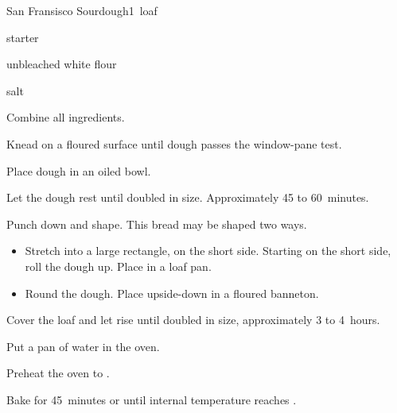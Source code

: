 \begin{recipe}{San Fransisco Sourdough}{}{1~loaf}

\begin{ingredients}
\item \C{1\threequarter} starter
\item {} unbleached white flour
\item {} salt
\end{ingredients}

\begin{directions}
\item Combine all ingredients.
\item Knead on a floured surface until dough passes the window-pane test.
\item Place dough in an oiled bowl.
\item Let the dough rest until doubled in size. Approximately 45 to 60~minutes.
\item Punch down and shape.
This bread may be shaped two ways.
\begin{itemize}
\item Stretch into a large rectangle,  on the short side. Starting on the short side, roll the dough up. Place in a loaf pan.
\item Round the dough. Place upside-down in a floured banneton.
\end{itemize}
\item Cover the loaf and let rise until doubled in size, approximately 3 to 4~hours.
\item Put a pan of water in the oven.
\item Preheat the oven to .
\item Bake for 45~minutes or until internal temperature reaches .
\end{directions}
\end{recipe}
